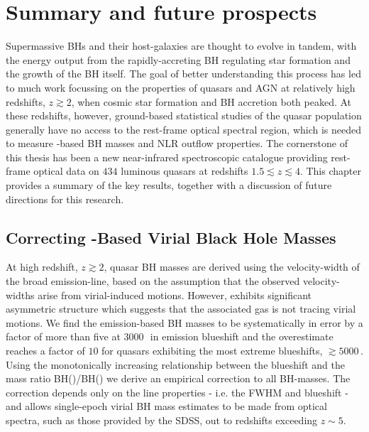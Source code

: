 
\chapter{Summary and future prospects}
\label{ch:summary} 


Supermassive BHs and their host-galaxies are thought to evolve in tandem, with the energy output from the rapidly-accreting BH regulating star formation and the growth of the BH itself. 
The goal of better understanding this process has led to much work focussing on the properties of quasars and AGN at relatively high redshifts, $z\gtrsim 2$, when cosmic star formation and BH accretion both peaked. 
At these redshifts, however, ground-based statistical studies of the quasar population generally have no access to the rest-frame optical spectral region, which is needed to measure \hbns-based BH masses and NLR outflow properties. 
The cornerstone of this thesis has been a new near-infrared spectroscopic catalogue providing rest-frame optical data on $434$ luminous quasars at redshifts $1.5 \lesssim z \lesssim 4$.
This chapter provides a summary of the key results, together with a discussion of future directions for this research. 

\section{Correcting -Based Virial Black Hole Masses}

At high redshift, $z \gtrsim 2$, quasar BH masses are derived using the velocity-width of the  broad emission-line, based on the assumption that the observed velocity-widths arise from virial-induced motions.  
However,  exhibits significant asymmetric structure which suggests that the associated gas is not tracing virial motions. 
We find the  emission-based BH masses to be systematically in error by a factor of more than five at $3000$\,\kms\, in  emission blueshift and the overestimate reaches a factor of $10$ for quasars exhibiting the most extreme blueshifts, $\gtrsim5000$\,\kms. 
Using the monotonically increasing relationship between the  blueshift and the mass ratio BH()/BH(\hans) we derive an empirical correction to all  BH-masses.
The correction depends only on the  line properties - i.e. the FWHM and blueshift - and allows single-epoch virial BH mass estimates to be made from optical spectra, such as those provided by the SDSS, out to redshifts exceeding $z\sim 5$. 

